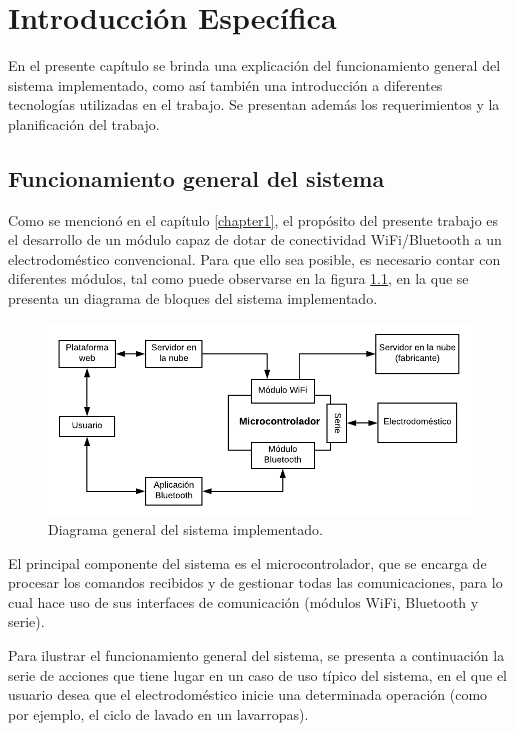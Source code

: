 \chapter{Introducción Específica}
\label{Chapter2}

En el presente capítulo se brinda una explicación del funcionamiento general del sistema implementado, como así también una introducción a diferentes tecnologías utilizadas en el trabajo. Se presentan además los requerimientos y la planificación del trabajo.

\section{Funcionamiento general del sistema}
\label{funcionamiento_general}

Como se mencionó en el capítulo \ref{chapter1}, el propósito del presente trabajo es el desarrollo de un módulo capaz de dotar de conectividad WiFi/Bluetooth a un electrodoméstico convencional. Para que ello sea posible, es necesario contar con diferentes módulos, tal como puede observarse en la figura \ref{fig:simplified_diagram}, en la que se presenta un diagrama de bloques del sistema implementado. 

\begin{figure}[h]
\centering
\includegraphics[width=\textwidth]{./Figures/simplified_diagram.pdf}
\caption{Diagrama general del sistema implementado.}
\label{fig:simplified_diagram}
\end{figure}

El principal componente del sistema es el microcontrolador, que se encarga de procesar los comandos recibidos y de gestionar todas las comunicaciones, para lo cual hace uso de sus interfaces de comunicación (módulos WiFi, Bluetooth y serie).

Para ilustrar el funcionamiento general del sistema, se presenta a continuación la serie de acciones que tiene lugar en un caso de uso típico del sistema, en el que el usuario desea que el electrodoméstico inicie una determinada operación (como por ejemplo, el ciclo de lavado en un lavarropas).

